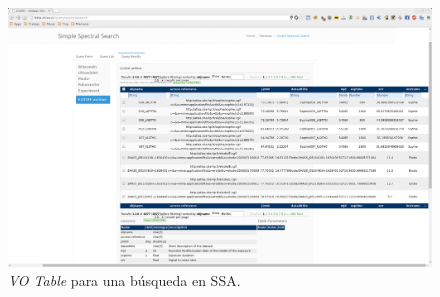 \begin{figure}[ht!]
    \begin{center}
	\includegraphics[scale=.2]{img/qrssavot}
    \end{center}
    \caption{\emph{VO Table} para una búsqueda en SSA.}
    \label{img:qrssavot}
\end{figure}

